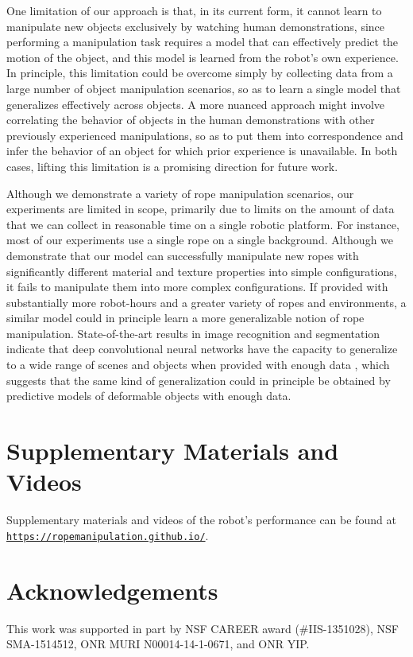 \documentclass[letterpaper, 10 pt, conference]{ieeeconf}  %
\begin{document}
One limitation of our approach is that, in its current form, it cannot learn to manipulate new objects exclusively by watching human demonstrations, since performing a manipulation task requires a model that can effectively predict the motion of the object, and this model is learned from the robot's own experience. In principle, this limitation could be overcome simply by collecting data from a large number of object manipulation scenarios, so as to learn a single model that generalizes effectively across objects. A more nuanced approach might involve correlating the behavior of objects in the human demonstrations with other previously experienced manipulations, so as to put them into correspondence and infer the behavior of an object for which prior experience is unavailable. In both cases, lifting this limitation is a promising direction for future work.

Although we demonstrate a variety of rope manipulation scenarios, our experiments are limited in scope, primarily due to limits on the amount of data that we can collect in reasonable time on a single robotic platform. For instance, most of our experiments use a single rope on a single background. Although we demonstrate that our model can successfully manipulate new ropes with significantly different material and texture properties into simple configurations, it fails to manipulate them into more complex configurations. 
If provided with substantially more robot-hours and a greater variety of ropes and environments, a similar model could in principle learn a more generalizable notion of rope manipulation. State-of-the-art results in image recognition and segmentation indicate that deep convolutional neural networks have the capacity to generalize to a wide range of scenes and objects when provided with enough data \cite{huh2016makes}, which suggests that the same kind of generalization could in principle be obtained by predictive models of deformable objects with enough data.

\section{Supplementary Materials and Videos}
Supplementary materials and videos of the robot's performance can be found at \href{https://ropemanipulation.github.io/}{\texttt{https://ropemanipulation.github.io/}}.

\section{Acknowledgements}

This work was supported in part by NSF CAREER award (\#IIS-1351028), NSF SMA-1514512, ONR MURI N00014-14-1-0671, and ONR YIP.

\addtolength{\textheight}{-9cm}

{\small


}
\end{document}
